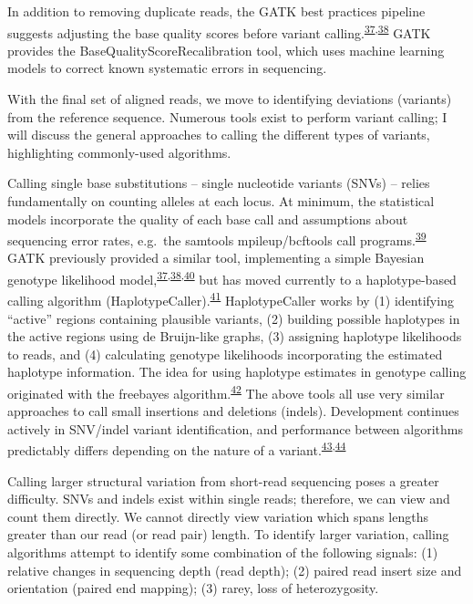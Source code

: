 \documentclass[11pt,letterpaper,oneside]{book}
\begin{document}
In addition to removing duplicate reads, the GATK best practices pipeline suggests adjusting the base quality scores before variant calling.\textsuperscript{\protect\hyperlink{ref-mckenna:2010aa}{37},\protect\hyperlink{ref-depristo:2011aa}{38}}
GATK provides the BaseQualityScoreRecalibration tool, which uses machine learning models to correct known systematic errors in sequencing.

With the final set of aligned reads, we move to identifying deviations (variants) from the reference sequence.
Numerous tools exist to perform variant calling; I will discuss the general approaches to calling the different types of variants, highlighting commonly-used algorithms.

Calling single base substitutions -- single nucleotide variants (SNVs) -- relies fundamentally on counting alleles at each locus.
At minimum, the statistical models incorporate the quality of each base call and assumptions about sequencing error rates, e.g.~the samtools mpileup/bcftools call programs.\textsuperscript{\protect\hyperlink{ref-li:2011aa}{39}}
GATK previously provided a similar tool, implementing a simple Bayesian genotype likelihood model,\textsuperscript{\protect\hyperlink{ref-mckenna:2010aa}{37},\protect\hyperlink{ref-depristo:2011aa}{38},\protect\hyperlink{ref-van-der-auwera:2013aa}{40}} but has moved currently to a haplotype-based calling algorithm (HaplotypeCaller).\textsuperscript{\protect\hyperlink{ref-poplin:2018aa}{41}}
HaplotypeCaller works by (1) identifying ``active'' regions containing plausible variants, (2) building possible haplotypes in the active regions using de Bruijn-like graphs, (3) assigning haplotype likelihoods to reads, and (4) calculating genotype likelihoods incorporating the estimated haplotype information.
The idea for using haplotype estimates in genotype calling originated with the freebayes algorithm.\textsuperscript{\protect\hyperlink{ref-garrison:2012aa}{42}}
The above tools all use very similar approaches to call small insertions and deletions (indels).
Development continues actively in SNV/indel variant identification, and performance between algorithms predictably differs depending on the nature of a variant.\textsuperscript{\protect\hyperlink{ref-chen:2019aa}{43},\protect\hyperlink{ref-xu:2018aa}{44}}

Calling larger structural variation from short-read sequencing poses a greater difficulty.
SNVs and indels exist within single reads; therefore, we can view and count them directly.
We cannot directly view variation which spans lengths greater than our read (or read pair) length.
To identify larger variation, calling algorithms attempt to identify some combination of the following signals: (1) relative changes in sequencing depth (read depth); (2) paired read insert size and orientation (paired end mapping); (3) rarey, loss of heterozygosity.
\end{document}
